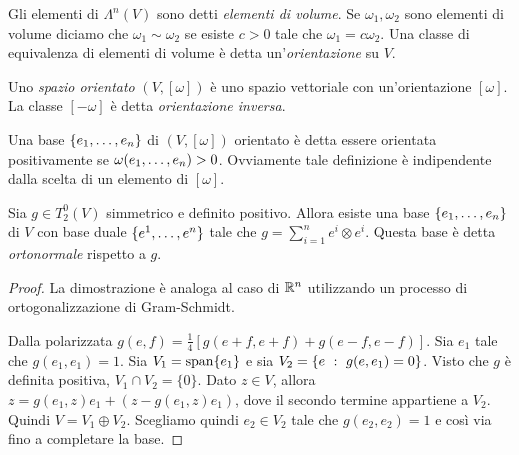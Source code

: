 \begin{definition}  
	Gli elementi di $\Lambda^n(V)$ sono detti \emph{elementi di volume}. Se $\omega_1,\omega_2$ sono elementi di volume diciamo che $\omega_1\sim \omega_2$ se esiste $c>0$ tale che $\omega_1 = c\omega_2$. Una classe di equivalenza di elementi di volume è detta un'\emph{orientazione} su $V$.
	
	Uno \emph{spazio orientato} $(V, [\omega])$ è uno spazio vettoriale con un'orientazione $[\omega]$. La classe $[-\omega]$ è detta \emph{orientazione inversa}.
	
	Una base $\{\seqb en,\}$ di $(V,[\omega])$ orientato è detta essere orientata positivamente se $\omega(\seqb en,)>0$. Ovviamente tale definizione è indipendente dalla scelta di un elemento di $[\omega]$.
\end{definition}

\begin{proposition}  \label{prop:EsistenzaBaseOrtonormale}
	Sia $g\in T^0_2(V)$ simmetrico e definito positivo. Allora esiste una base $\{\seqb en,\}$ di $V$ con base duale $\{\seqa en,\}$ tale che $g = \sum_{i=1}^n e^i\otimes e^i$. Questa base è detta \emph{ortonormale} rispetto a $g$.
\end{proposition}
\begin{proof} %
	La dimostrazione è analoga al caso di $\R^n$ utilizzando un processo di ortogonalizzazione di Gram-Schmidt.
	
	Dalla polarizzata $g(e,f) = \frac 14 [g(e+f,e+f) + g(e-f,e-f)]$.
	Sia $e_1$ tale che $g(e_1,e_1) = 1$. Sia $V_1 = \spanrm \{e_1\}$ e sia $V_2 = \{e \suchthat g(e,e_1) = 0\}$.
	Visto che $g$ è definita positiva, $V_1\cap V_2= \{0\}$. Dato $z\in V$, allora $z = g(e_1,z)e_1 + (z-g(e_1,z)e_1)$, dove il secondo termine appartiene a $V_2$. Quindi $V = V_1\oplus V_2$.
	Scegliamo quindi $e_2\in V_2$ tale che $g(e_2,e_2)=1$ e così via fino a completare la base.
\end{proof}


